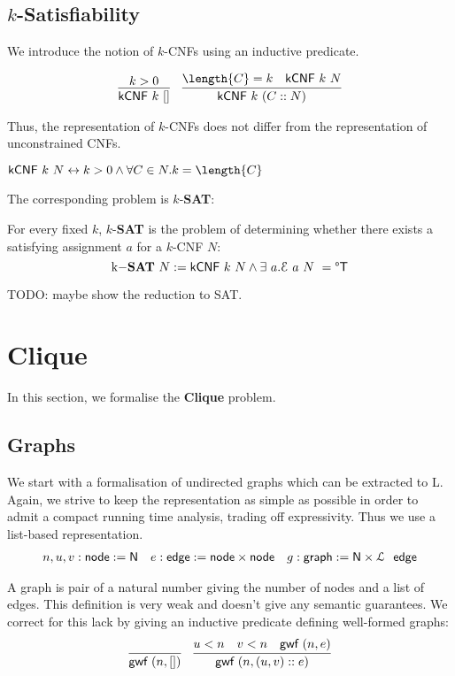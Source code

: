 \documentclass[a4paper,UKenglish,cleveref, autoref]{lipics-v2019}
\begin{document}
\subsection{$k$-Satisfiability}
We introduce the notion of $k$-CNFs using an inductive predicate.

\begin{align*}
  \infer{\textsf{kCNF}~k~[]}{k > 0} && \infer{\textsf{kCNF}~k~(C::N)}{\length{C} = k \quad \textsf{kCNF}~k~N}
\end{align*}

Thus, the representation of $k$-CNFs does not differ from the representation of unconstrained CNFs. 

\begin{proposition}\label{prop:kCNFexp}
  $\textsf{kCNF}~k~N \leftrightarrow k > 0 \land \forall C \in N. k = \length{C}$
\end{proposition}

The corresponding problem is $k$-\textbf{SAT}:
\begin{definition}
  For every fixed $k$, $k$-\textbf{SAT} is the problem of determining whether there exists a satisfying assignment $a$ for a $k$-CNF $N$: 
  \[$k$-\textbf{SAT}~N := \textsf{kCNF}~k~N \land \exists~a.\eval{a}{N} = \Some{\btrue} \]
\end{definition}

TODO: maybe show the reduction to SAT.

\section{Clique}
In this section, we formalise the \textbf{Clique} problem. 

\subsection{Graphs}
\newcommand{\lnode}{\textsf{node}}
\newcommand{\ledge}{\textsf{edge}}
\newcommand{\lgraph}{\textsf{graph}}
We start with a formalisation of undirected graphs which can be extracted to L. Again, we strive to keep the representation as simple as possible in order to admit a compact running time analysis, trading off expressivity. Thus we use a list-based representation.
\begin{align*}
  n,u,v : \lnode := \nat && e : \ledge := \lnode \times \lnode && g : \lgraph := \nat \times \listsof~\ledge 
\end{align*}

A graph is pair of a natural number giving the number of nodes and a list of edges. This definition is very weak and doesn't give any semantic guarantees. We correct for this lack by giving an inductive predicate defining well-formed graphs:
\begin{align*}
  \infer{\textsf{gwf}~(n,[])}{} && \infer{\textsf{gwf}~(n,(u, v) :: e)}{u < n \quad v < n \quad \textsf{gwf}~(n, e)}
\end{align*}
\end{document}
